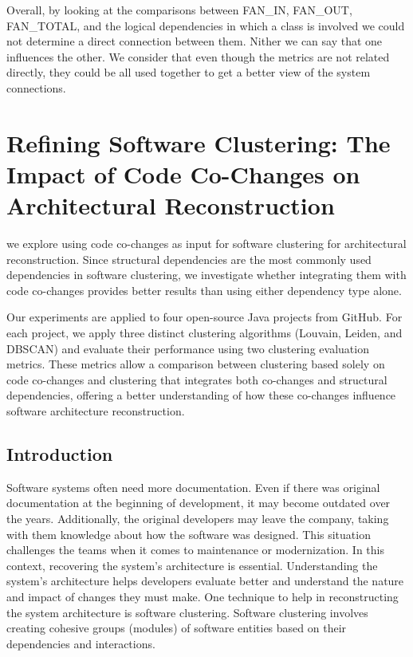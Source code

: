 \documentclass[12pt, a4paper, twoside]{report}
\begin{document}
Overall, by looking at the comparisons between FAN\_IN, FAN\_OUT, FAN\_TOTAL, and the logical dependencies in which a class is involved we could not determine a direct connection between them. Nither we can say that one influences the other.  We consider that even though the metrics are not related directly, they could be all used together to get a better view of the system connections.

\chapter{Refining Software Clustering: The Impact of Code Co-Changes on Architectural Reconstruction}
we explore using code co-changes as input for software clustering for architectural reconstruction. Since structural dependencies are the most commonly used dependencies in software clustering, we investigate whether integrating them with code co-changes provides better results than using either dependency type alone.

Our experiments are applied to four open-source Java projects from GitHub. For each project, we apply three distinct clustering algorithms (Louvain, Leiden, and DBSCAN) and evaluate their performance using two clustering evaluation metrics. These metrics allow a comparison between clustering based solely on code co-changes and clustering that integrates both co-changes and structural dependencies, offering a better understanding of how these co-changes influence software architecture reconstruction.


\section{Introduction}
\label{sec:introduction}

Software systems often need more documentation. Even if there was original documentation at the beginning of development, it may become outdated over the years. Additionally, the original developers may leave the company, taking with them knowledge about how the software was designed. This situation challenges the teams when it comes to maintenance or modernization. In this context, recovering the system's architecture is essential. Understanding the system's architecture helps developers evaluate better and understand the nature and impact of changes they must make. One technique to help in reconstructing the system architecture is software clustering. Software clustering involves creating cohesive groups (modules) of software entities based on their dependencies and interactions.
\end{document}
